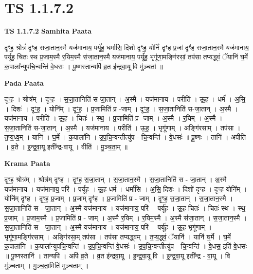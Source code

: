 \documentclass[17pt]{extarticle}
\begin{document}
\section*{ TS 1.1.7.2 }

\textbf{TS 1.1.7.2 } \newline
\textbf{Samhita Paata} \newline

दृꣳह॒ श्रोत्रं॑ दृꣳह सजा॒तान॒स्मै यज॑मानाय॒ पर्यू॑ह॒ धर्मा॑सि॒ दिशो॑ दृꣳह॒ योनिं॑ दृꣳह प्र॒जां दृꣳ॑ह सजा॒तान॒स्मै यज॑मानाय॒ पर्यू॑ह॒ चितः॑ स्थ प्र॒जाम॒स्मै र॒यिम॒स्मै स॑जा॒तान॒स्मै यज॑मानाय॒ पर्यू॑ह॒ भृगू॑णा॒मङ्गि॑रसां॒ तप॑सा तप्यद्ध्वं॒ ॅयानि॑ घ॒र्मे क॒पाला᳚न्युपचि॒न्वन्ति॑ वे॒धसः॑ । पू॒ष्णस्तान्यपि॑ व्र॒त इ॑न्द्रवा॒यू वि मु॑ञ्चतां ॥ \newline

\textbf{Pada Paata} \newline

दृꣳ॒॒ह॒ । श्रोत्र᳚म् । दृꣳ॒॒ह॒ । स॒जा॒तानिति॑ स-जा॒तान् । अ॒स्मै । यज॑मानाय । परीति॑ । ऊ॒ह॒ । धर्म॑ । अ॒सि॒ । दिशः॑ । दृꣳ॒॒ह॒ । योनि᳚म् । दृꣳ॒॒ह॒ । प्र॒जामिति॑ प्र -जाम् । दृꣳ॒॒ह॒ । स॒जा॒तानिति॑ स-जा॒तान् । अ॒स्मै । यज॑मानाय । परीति॑ । ऊ॒ह॒ । चितः॑ । स्थ॒ । प्र॒जामिति॑ प्र -जाम् । अ॒स्मै । र॒यिम् । अ॒स्मै । स॒जा॒तानिति॑ स-जा॒तान् । अ॒स्मै । यज॑मानाय । परीति॑ । ऊ॒ह॒ । भृगू॑णाम् । अङ्गि॑रसाम् । तप॑सा । त॒प्य॒ध्व॒म् । यानि॑ । घ॒र्मे । क॒पाला॑नि । उ॒प॒चि॒न्वन्तीत्यु॑प - चि॒न्वन्ति॑ । वे॒धसः॑ ॥ पू॒ष्णः । तानि॑ । अपीति॑ । व्र॒ते । इ॒न्द्र॒वा॒यू इती᳚न्द्र-वायू । वीति॑ । मु॒ञ्च॒ता॒म् ॥  \newline


\textbf{Krama Paata} \newline

दृꣳ॒॒ह॒ श्रोत्र᳚म् । श्रोत्र॑म् दृꣳह । दृꣳ॒॒ह॒ स॒जा॒तान् । स॒जा॒तान॒स्मै । स॒जा॒तानिति॑ स - जा॒तान् । अ॒स्मै यज॑मानाय । यज॑मानाय॒ परि॑ । पर्यू॑ह । ऊ॒ह॒ धर्म॑ । धर्मा॑सि । अ॒सि॒ दिशः॑ । दिशो॑ दृꣳह । दृꣳ॒॒ह॒ योनि᳚म् । योनि॑म् दृꣳह । दृꣳ॒॒ह॒ प्र॒जाम् । प्र॒जाम् दृꣳ॑ह । प्र॒जामिति॑ प्र - जाम् । दृꣳ॒॒ह॒ स॒जा॒तान् । स॒जा॒तान॒स्मै । स॒जा॒तानिति॑ स - जा॒तान् । अ॒स्मै यज॑मानाय । यज॑मानाय॒ परि॑ । पर्यू॑ह । ऊ॒ह॒ चितः॑ । चितः॑ स्थ । स्थ॒ प्र॒जाम् । प्र॒जाम॒स्मै । प्र॒जामिति॑ प्र - जाम् । अ॒स्मै र॒यिम् । र॒यिम॒स्मै । अ॒स्मै स॑जा॒तान् । स॒जा॒तान॒स्मै । स॒जा॒तानिति॑ स - जा॒तान् । अ॒स्मै यज॑मानाय । यज॑मानाय॒ परि॑ । पर्यू॑ह । ऊ॒ह॒ भृगू॑णाम् । भृगू॑णा॒मङ्‍गि॑रसाम् । अङ्‍गि॑रसा॒म् तप॑सा । तप॑सा तप्यद्ध्वम् । त॒प्य॒द्ध्वं॒ ॅयानि॑ । यानि॑ घ॒र्मे । घ॒र्मे क॒पाला॑नि । क॒पाला᳚न्युपचि॒न्वन्ति॑ । उ॒प॒चि॒न्वन्ति॑ वे॒धसः॑ । उ॒प॒चि॒न्वन्तीत्यु॑प - चि॒न्वन्ति॑ । वे॒धस॒ इति॑ वे॒धसः॑ ॥ पू॒ष्णस्तानि॑ । तान्यपि॑ । अपि॑ व्र॒ते । व्र॒त इ॑न्द्रवा॒यू । इ॒न्द्र॒वा॒यू वि । इ॒न्द्र॒वा॒यू इती᳚न्द्र - वा॒यू । वि मु॑ञ्चताम् । मु॒ञ्च॒ता॒मिति॑ मुञ्चताम् । \newline
\end{document}
